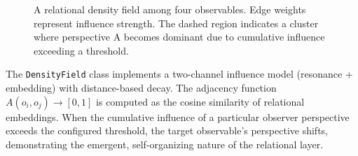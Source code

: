 \begin{figure}[htbp]
    \centering
    \caption{A relational density field among four observables. Edge weights represent influence strength. The dashed region indicates a cluster where perspective A becomes dominant due to cumulative influence exceeding a threshold.}
    \label{fig:density}
\end{figure}

The \texttt{DensityField} class implements a two-channel influence model (resonance + embedding) with distance-based decay. The adjacency function $A(o_i, o_j) \to [0,1]$ is computed as the cosine similarity of relational embeddings. When the cumulative influence of a particular observer perspective exceeds the configured threshold, the target observable's perspective shifts, demonstrating the emergent, self-organizing nature of the relational layer.